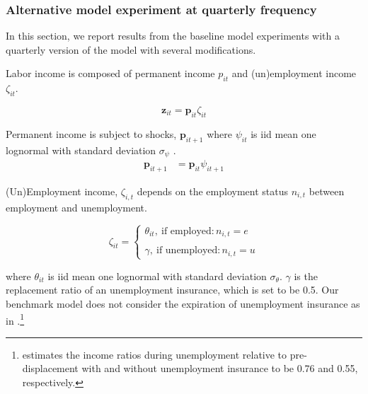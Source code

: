 \subsubsection{Alternative model experiment at quarterly frequency}



In this section, we report results from the baseline model experiments with a quarterly version of the model with several modifications.



Labor income is composed of permanent income $p_{it}$ and (un)employment income $\zeta_{it}$.

$$\mathbf{z}_{it} = \mathbf{p}_{it}\zeta_{it}$$

Permanent income is subject to shocks, $\mathbf{p}_{it+1}$ where $\psi_{it}$ is iid mean one lognormal with standard deviation $\sigma_\psi$ .
\begin{align*}
\mathbf{p}_{it+1} &=\mathbf{p}_{it} \psi_{it+1} 
\end{align*}




(Un)Employment income, $\zeta_{i,t}$ depends on the employment status $n_{i,t}$ between employment and unemployment.   

$$
\zeta _{it} =
\begin{cases}
\theta_{it} , \  \text{if employed}  : n_{i,t}=e\\ \\
\gamma, \  \text{if unemployed}: n_{i,t}=u  %
\end{cases}
$$ 

where $\theta_{it}$ is iid mean one lognormal with standard deviation $\sigma_\theta$. 
$\gamma$ is the replacement ratio of an unemployment insurance, which is set to be 0.5. Our benchmark model does not consider the expiration of unemployment insurance as in \cite{kekre2023unemployment}.\footnote{\cite{kekre2023unemployment} estimates the income ratios during unemployment relative to pre-displacement with and without unemployment insurance to be 0.76 and 0.55, respectively.} 


